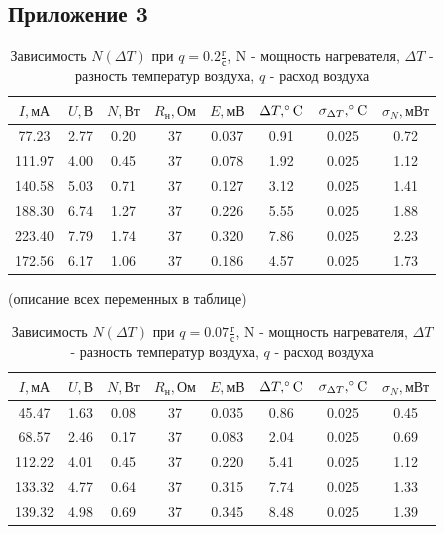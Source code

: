 \subsection{Приложение 3} \label{Приложение 3}
\begin{table}[h]
    \centering
    \begin{tabular}{|c|c|c|c|c|c|c|c|}
    \hline
    $I, \text{мА}$ &  $U, \text{В}$ & $N, \text{Вт}$ & $R_{\text{н}}, \text{Ом}$ & $E, \text{мВ}$ & $\Delta T, \celsius$ & $\sigma_{\Delta T}, \celsius$ & $\sigma_N, \text{мВт}$ \\ \hline
    77.23  & 2.77 & 0.20  & 37  & 0.037  & 0.91 & 0.025 & 0.72 \\ \hline
    111.97 & 4.00 & 0.45  & 37  & 0.078  & 1.92 & 0.025 & 1.12 \\ \hline
    140.58 & 5.03 & 0.71  & 37  & 0.127  & 3.12 & 0.025 & 1.41 \\ \hline
    188.30 & 6.74 & 1.27  & 37  & 0.226  & 5.55 & 0.025 & 1.88 \\ \hline
    223.40 & 7.79 & 1.74  & 37  & 0.320  & 7.86 & 0.025 & 2.23 \\ \hline
    172.56 & 6.17 & 1.06  & 37  & 0.186  & 4.57 & 0.025 & 1.73 \\ \hline
\end{tabular}
    \caption{Зависимость $N(\Delta T)$ при $q = 0.2\frac{\text{г}}{\text{с}}$, N - мощность нагревателя, $\Delta T$ - разность температур воздуха, $q$ - расход воздуха}
    \label{tab:q1}
\end{table}
(описание всех переменных в таблице)

\begin{table}[h]
    \centering
    \begin{tabular}{|c|c|c|c|c|c|c|c|}
    \hline
    $I, \text{мА}$ &  $U, \text{В}$ & $N, \text{Вт}$ & $R_{\text{н}}, \text{Ом}$ & $E, \text{мВ}$ & $\Delta T, \celsius$ & $\sigma_{\Delta T}, \celsius$ & $\sigma_N, \text{мВт}$ \\ \hline
    45.47  & 1.63 & 0.08  & 37  & 0.035  & 0.86 & 0.025 & 0.45 \\ \hline
    68.57  & 2.46 & 0.17  & 37  & 0.083  & 2.04 & 0.025 & 0.69 \\ \hline
    112.22 & 4.01 & 0.45  & 37  & 0.220  & 5.41 & 0.025 & 1.12 \\ \hline
    133.32 & 4.77 & 0.64  & 37  & 0.315  & 7.74 & 0.025 & 1.33 \\ \hline
    139.32 & 4.98 & 0.69  & 37  & 0.345  & 8.48 & 0.025 & 1.39 \\ \hline
\end{tabular}
    \caption{Зависимость $N(\Delta T)$ при $q = 0.07\frac{\text{г}}{\text{с}}$, N - мощность нагревателя, $\Delta T$ - разность температур воздуха, $q$ - расход воздуха}
    \label{tab:q2}
\end{table}
\newpage

